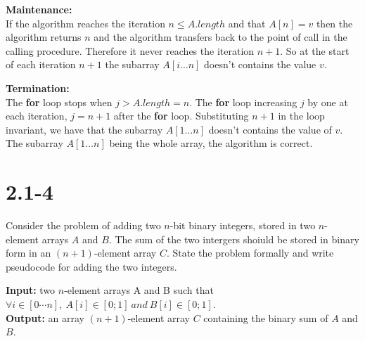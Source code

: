 \documentclass{article}
\begin{document}
\textbf{Maintenance:}\\
If the algorithm reaches the iteration \(n \leq A.length\) and that \(A[n] = v\) then the algorithm returns \(n\) and the algorithm transfers back to the point of call in the calling procedure. Therefore it never reaches the iteration \(n + 1\). So at the start of each iteration \(n + 1\) the subarray \(A[i\hdots n]\) doesn't contains the value \(v\).

\textbf{Termination:}\\
The \textbf{for} loop stops when \(j > A.length = n\). The \textbf{for} loop increasing \(j\) by one at each iteration, \(j = n + 1\) after the \textbf{for} loop. Substituting \(n + 1\) in the loop invariant, we have that the subarray \(A[1\hdots n]\) doesn't contains the value of \(v\). The subarray \(A[1\hdots n]\) being the whole array, the algorithm is correct.


\section{2.1-4}

Consider the problem of adding two \(n\)-bit binary integers, stored in two \(n\)-element arrays \(A\) and \(B\). The sum of the two intergers shoiuld be stored in binary form in an \((n + 1)\)-element array \(C\). State the problem formally and write pseudocode for adding the two integers.

\textbf{Input:} two \(n\)-element arrays A and B such that \(\forall i \in [0\cdots n],\ A[i] \in [0;1]\ and\ B[i] \in [0;1]\).\\
\textbf{Output:} an array \((n + 1)\)-element array \(C\) containing the binary sum of \(A\) and \(B\).\\

\begin{algorithmic}
    \ENDFOR
\end{algorithmic}
\end{document}
